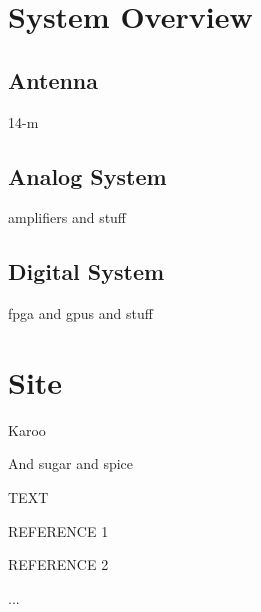 \documentclass[ars]{/Users/daviddeboer1/Documents/Papers/Copernicus_LaTeX_Package_v_2_7/copernicus}
\begin{document}
\section{System Overview}
\subsection{Antenna}
14-m

\subsection{Analog System}
amplifiers and stuff

\subsection{Digital System}
fpga and gpus and stuff

\section{Site}
Karoo


\conclusions  %
And sugar and spice







\begin{acknowledgements}
TEXT
\end{acknowledgements}




\begin{thebibliography}{}

REFERENCE 1

REFERENCE 2

...

\end{thebibliography}
\end{document}
